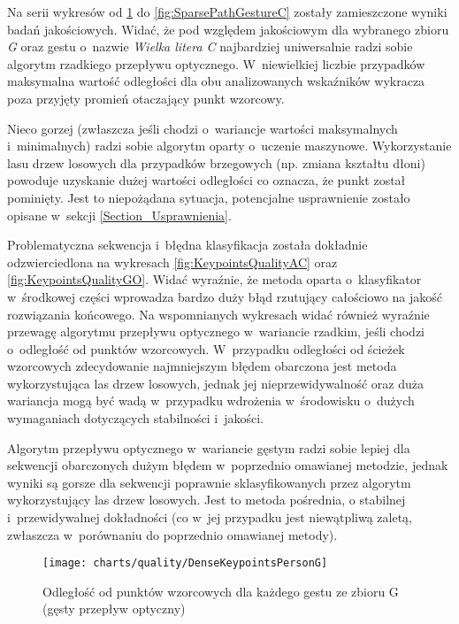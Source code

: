    Na serii wykresów od \ref{fig:DenseKeypointsPersonG} do \ref{fig:SparsePathGestureC} zostały zamieszczone wyniki badań jakościowych. Widać, że pod względem jakościowym dla wybranego zbioru \textit{G} oraz gestu o~nazwie \textit{Wielka litera C} najbardziej uniwersalnie radzi sobie algorytm rzadkiego przepływu optycznego. W~niewielkiej liczbie przypadków maksymalna wartość odległości dla obu analizowanych wskaźników wykracza poza przyjęty promień otaczający punkt wzorcowy.

    Nieco gorzej (zwłaszcza jeśli chodzi o~wariancje wartości maksymalnych i~minimalnych) radzi sobie algorytm oparty o~uczenie maszynowe. Wykorzystanie lasu drzew losowych dla przypadków brzegowych (np. zmiana kształtu dłoni) powoduje uzyskanie dużej wartości odległości co oznacza, że punkt został pominięty. Jest to niepożądana sytuacja, potencjalne usprawnienie zostało opisane w~sekcji \ref{Section_Usprawnienia}.

    Problematyczna sekwencja i~błędna klasyfikacja została dokładnie odzwierciedlona na wykresach \ref{fig:KeypointsQualityAC} oraz \ref{fig:KeypointsQualityGO}. Widać wyraźnie, że metoda oparta o~klasyfikator w~środkowej części wprowadza bardzo duży błąd rzutujący całościowo na jakość rozwiązania końcowego. Na wspomnianych wykresach widać również wyraźnie przewagę algorytmu przepływu optycznego w~wariancie rzadkim, jeśli chodzi o~odległość od punktów wzorcowych. W~przypadku odległości od ścieżek wzorcowych zdecydowanie najmniejszym błędem obarczona jest metoda wykorzystująca las drzew losowych, jednak jej nieprzewidywalność oraz duża wariancja mogą być wadą w~przypadku wdrożenia w~środowisku o~dużych wymaganiach dotyczących stabilności i~jakości.

    Algorytm przepływu optycznego w~wariancie gęstym radzi sobie lepiej dla sekwencji obarczonych dużym błędem w~poprzednio omawianej metodzie, jednak wyniki są gorsze dla sekwencji poprawnie sklasyfikowanych przez algorytm wykorzystujący las drzew losowych. Jest to metoda pośrednia, o stabilnej i~przewidywalnej dokładności (co w~jej przypadku jest niewątpliwą zaletą, zwłaszcza w~porównaniu do poprzednio omawianej metody).

    \newpage
      \begin{figure}[!ht]
        \centering
        \texttt{[image: charts/quality/DenseKeypointsPersonG]}
        \caption[Odległość od punktów wzorcowych dla każdego gestu (gęsty przepływ optyczny)]
                {Odległość od punktów wzorcowych dla każdego gestu ze zbioru G (gęsty przepływ optyczny)}
        \label{fig:DenseKeypointsPersonG}
      \end{figure}

